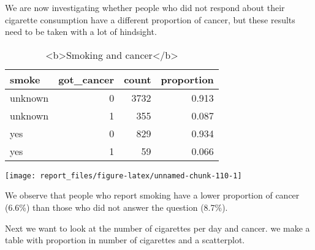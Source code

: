 \documentclass[
]{article}
\begin{document}
We are now investigating whether people who did not respond about their
cigarette consumption have a different proportion of cancer, but these
results need to be taken with a lot of hindsight.

\begin{table}

\caption{\label{tab:unnamed-chunk-110}<b>Smoking and cancer</b>}
\centering
\begin{tabular}[t]{l|r|r|r}
\hline
smoke & got\_cancer & count & proportion\\
\hline
unknown & 0 & 3732 & 0.913\\
\hline
unknown & 1 & 355 & 0.087\\
\hline
yes & 0 & 829 & 0.934\\
\hline
yes & 1 & 59 & 0.066\\
\hline
\end{tabular}
\end{table}

\begin{center}\texttt{[image: report\_files/figure-latex/unnamed-chunk-110-1]} \end{center}

We observe that people who report smoking have a lower proportion of
cancer (6.6\%) than those who did not answer the question (8.7\%).

Next we want to look at the number of cigarettes per day and cancer. we
make a table with proportion in number of cigarettes and a scatterplot.
\end{document}
